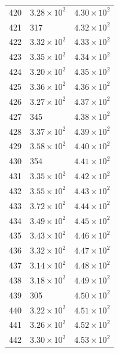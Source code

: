 \begin{table}[H]
\begin{tabular}{lll}
420 & $\displaystyle 3.28 \times 10^{2}$ & $\displaystyle 4.30 \times 10^{2}$ \\
421 & 317 & $\displaystyle 4.32 \times 10^{2}$ \\
422 & $\displaystyle 3.32 \times 10^{2}$ & $\displaystyle 4.33 \times 10^{2}$ \\
423 & $\displaystyle 3.35 \times 10^{2}$ & $\displaystyle 4.34 \times 10^{2}$ \\
424 & $\displaystyle 3.20 \times 10^{2}$ & $\displaystyle 4.35 \times 10^{2}$ \\
425 & $\displaystyle 3.36 \times 10^{2}$ & $\displaystyle 4.36 \times 10^{2}$ \\
426 & $\displaystyle 3.27 \times 10^{2}$ & $\displaystyle 4.37 \times 10^{2}$ \\
427 & 345 & $\displaystyle 4.38 \times 10^{2}$ \\
428 & $\displaystyle 3.37 \times 10^{2}$ & $\displaystyle 4.39 \times 10^{2}$ \\
429 & $\displaystyle 3.58 \times 10^{2}$ & $\displaystyle 4.40 \times 10^{2}$ \\
430 & 354 & $\displaystyle 4.41 \times 10^{2}$ \\
431 & $\displaystyle 3.35 \times 10^{2}$ & $\displaystyle 4.42 \times 10^{2}$ \\
432 & $\displaystyle 3.55 \times 10^{2}$ & $\displaystyle 4.43 \times 10^{2}$ \\
433 & $\displaystyle 3.72 \times 10^{2}$ & $\displaystyle 4.44 \times 10^{2}$ \\
434 & $\displaystyle 3.49 \times 10^{2}$ & $\displaystyle 4.45 \times 10^{2}$ \\
435 & $\displaystyle 3.43 \times 10^{2}$ & $\displaystyle 4.46 \times 10^{2}$ \\
436 & $\displaystyle 3.32 \times 10^{2}$ & $\displaystyle 4.47 \times 10^{2}$ \\
437 & $\displaystyle 3.14 \times 10^{2}$ & $\displaystyle 4.48 \times 10^{2}$ \\
438 & $\displaystyle 3.18 \times 10^{2}$ & $\displaystyle 4.49 \times 10^{2}$ \\
439 & 305 & $\displaystyle 4.50 \times 10^{2}$ \\
440 & $\displaystyle 3.22 \times 10^{2}$ & $\displaystyle 4.51 \times 10^{2}$ \\
441 & $\displaystyle 3.26 \times 10^{2}$ & $\displaystyle 4.52 \times 10^{2}$ \\
442 & $\displaystyle 3.30 \times 10^{2}$ & $\displaystyle 4.53 \times 10^{2}$ \\

\end{tabular}
\end{table}
